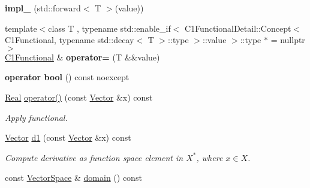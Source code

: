\begin{DoxyCompactItemize}
\item 
\hypertarget{classSpacy_1_1C1Functional_a250d4ea5bc261d8719c1ebb0a5037aac}{{\bfseries impl\-\_\-} (std\-::forward$<$ T $>$(value))}\label{classSpacy_1_1C1Functional_a250d4ea5bc261d8719c1ebb0a5037aac}

\item 
\hypertarget{classSpacy_1_1C1Functional_a1a6c4893ea11ebeff6647fc12f8b979d}{{\footnotesize template$<$class T , typename std\-::enable\-\_\-if$<$ C1\-Functional\-Detail\-::\-Concept$<$ C1\-Functional, typename std\-::decay$<$ T $>$\-::type $>$\-::value $>$\-::type $\ast$  = nullptr$>$ }\\\hyperlink{classSpacy_1_1C1Functional}{C1\-Functional} \& {\bfseries operator=} (T \&\&value)}\label{classSpacy_1_1C1Functional_a1a6c4893ea11ebeff6647fc12f8b979d}

\item 
\hypertarget{classSpacy_1_1C1Functional_a0b5ae1057d50803d71c7e221424e1ed4}{{\bfseries operator bool} () const noexcept}\label{classSpacy_1_1C1Functional_a0b5ae1057d50803d71c7e221424e1ed4}

\item 
\hypertarget{classSpacy_1_1C1Functional_a621b710f0c8c583d074f4bf4da3cbb09}{\hyperlink{classSpacy_1_1Real}{Real} \hyperlink{classSpacy_1_1C1Functional_a621b710f0c8c583d074f4bf4da3cbb09}{operator()} (const \hyperlink{classSpacy_1_1Vector}{Vector} \&x) const }\label{classSpacy_1_1C1Functional_a621b710f0c8c583d074f4bf4da3cbb09}

\begin{DoxyCompactList}\small\item\em Apply functional. \end{DoxyCompactList}\item 
\hypertarget{classSpacy_1_1C1Functional_a5953291c58bf20e87ab2bfe26231fe49}{\hyperlink{classSpacy_1_1Vector}{Vector} \hyperlink{classSpacy_1_1C1Functional_a5953291c58bf20e87ab2bfe26231fe49}{d1} (const \hyperlink{classSpacy_1_1Vector}{Vector} \&x) const }\label{classSpacy_1_1C1Functional_a5953291c58bf20e87ab2bfe26231fe49}

\begin{DoxyCompactList}\small\item\em Compute derivative as function space element in $X^*$, where $x\in X$. \end{DoxyCompactList}\item 
\hypertarget{classSpacy_1_1C1Functional_a3ec8df7e7998b557445c907cbd8e80b8}{const \hyperlink{classSpacy_1_1VectorSpace}{Vector\-Space} \& \hyperlink{classSpacy_1_1C1Functional_a3ec8df7e7998b557445c907cbd8e80b8}{domain} () const }\label{classSpacy_1_1C1Functional_a3ec8df7e7998b557445c907cbd8e80b8}


\end{DoxyCompactItemize}
